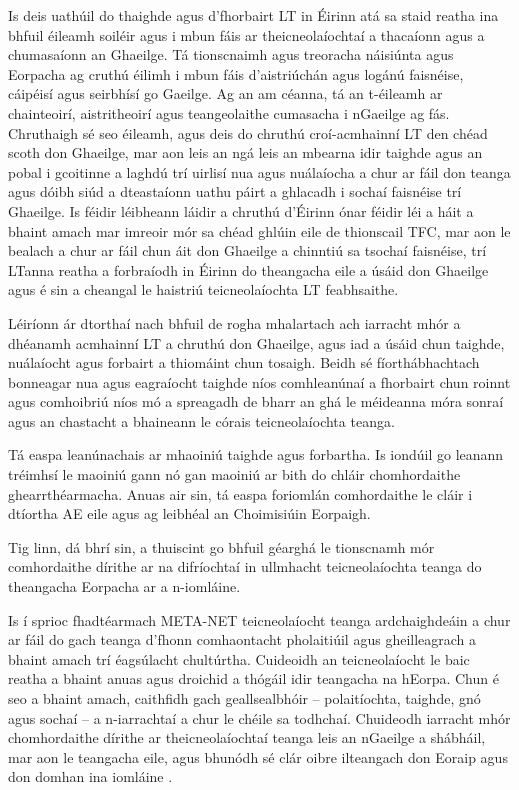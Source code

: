\documentclass[]{../../metanetpaper}
\begin{document}
\begin{multicols}{2}
Is deis uathúil do thaighde agus d’fhorbairt LT in Éirinn atá sa staid reatha ina bhfuil éileamh soiléir agus i mbun fáis ar theicneolaíochtaí a thacaíonn agus a chumasaíonn an Ghaeilge. Tá tionscnaimh agus treoracha náisiúnta agus Eorpacha ag cruthú éilimh i mbun fáis d’aistriúchán agus logánú faisnéise, cáipéisí agus seirbhísí go Gaeilge. Ag an am céanna, tá an t-éileamh ar chainteoirí, aistritheoirí agus teangeolaithe cumasacha i nGaeilge ag fás. Chruthaigh sé seo éileamh, agus deis do chruthú croí-acmhainní LT den chéad scoth don Ghaeilge, mar aon leis an ngá leis an mbearna idir taighde agus an pobal i gcoitinne a laghdú trí uirlisí nua agus nuálaíocha a chur ar fáil don teanga agus dóibh siúd a dteastaíonn uathu páirt a ghlacadh i sochaí faisnéise trí Ghaeilge. Is féidir léibheann láidir a chruthú d’Éirinn ónar féidir léi a háit a bhaint amach mar imreoir mór sa chéad ghlúin eile de thionscail TFC, mar aon le bealach a chur ar fáil chun áit don Ghaeilge a chinntiú sa tsochaí faisnéise, trí LTanna reatha a forbraíodh in Éirinn do theangacha eile a úsáid don Ghaeilge agus é sin a cheangal le haistriú teicneolaíochta LT feabhsaithe.

Léiríonn ár dtorthaí nach bhfuil de rogha mhalartach ach iarracht mhór a dhéanamh acmhainní LT a chruthú don Ghaeilge, agus iad a úsáid chun taighde, nuálaíocht agus forbairt a thiomáint chun tosaigh. Beidh sé fíorthábhachtach bonneagar nua agus eagraíocht taighde níos comhleanúnaí a fhorbairt chun roinnt agus comhoibriú níos mó a spreagadh de bharr an ghá le méideanna móra sonraí agus an chastacht a bhaineann le córais teicneolaíochta teanga.

Tá easpa leanúnachais ar mhaoiniú taighde agus forbartha. Is iondúil go leanann tréimhsí le maoiniú gann nó gan maoiniú ar bith do chláir chomhordaithe ghearrthéarmacha. Anuas air sin, tá easpa foriomlán comhordaithe le cláir i dtíortha AE eile agus ag leibhéal an Choimisiúin Eorpaigh.

Tig linn, dá bhrí sin, a thuiscint go bhfuil géarghá le tionscnamh mór comhordaithe dírithe ar na difríochtaí in ullmhacht teicneolaíochta teanga do theangacha Eorpacha ar a n-iomláine.

Is í sprioc fhadtéarmach META-NET teicneolaíocht teanga ardchaighdeáin a chur ar fáil do gach teanga d’fhonn comhaontacht pholaitiúil agus gheilleagrach a bhaint amach trí éagsúlacht chultúrtha. Cuideoidh an teicneolaíocht le baic reatha a bhaint anuas agus droichid a thógáil idir teangacha na hEorpa. Chun é seo a bhaint amach, caithfidh gach geallsealbhóir – polaitíochta, taighde, gnó agus sochaí – a n-iarrachtaí a chur le chéile sa todhchaí. Chuideodh iarracht mhór chomhordaithe dírithe ar theicneolaíochtaí teanga leis an nGaeilge a shábháil, mar aon le teangacha eile, agus bhunódh sé clár oibre ilteangach don Eoraip agus don domhan ina iomláine \cite{tcstar}. 
 
\end{multicols}
\end{document}
